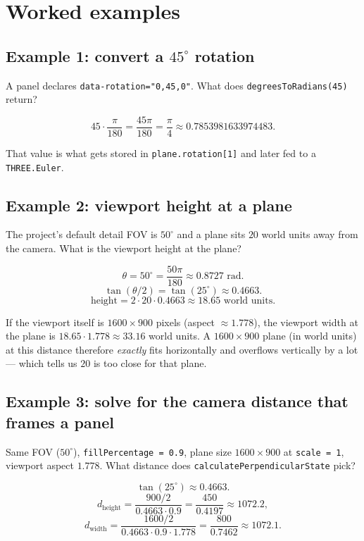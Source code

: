\documentclass{article}
\begin{document}
\section{Worked examples}

\subsection*{Example 1: convert a $45^\circ$ rotation}

A panel declares \lstinline{data-rotation="0,45,0"}. What does
\lstinline{degreesToRadians(45)} return?

\[
  45 \cdot \frac{\pi}{180} = \frac{45\pi}{180} = \frac{\pi}{4} \approx 0.7853981633974483.
\]

That value is what gets stored in \lstinline{plane.rotation[1]} and later
fed to a \lstinline{THREE.Euler}.

\subsection*{Example 2: viewport height at a plane}

The project's default detail FOV is $50^\circ$ and a plane sits $20$ world
units away from the camera. What is the viewport height at the plane?

\[
  \theta = 50^\circ = \frac{50\pi}{180} \approx 0.8727 \text{ rad}.
\]
\[
  \tan(\theta/2) = \tan(25^\circ) \approx 0.4663.
\]
\[
  \text{height} = 2 \cdot 20 \cdot 0.4663 \approx 18.65 \text{ world units}.
\]

If the viewport itself is $1600 \times 900$ pixels (aspect $\approx 1.778$),
the viewport width at the plane is $18.65 \cdot 1.778 \approx 33.16$ world
units. A $1600 \times 900$ plane (in world units) at this distance therefore
\emph{exactly} fits horizontally and overflows vertically by a lot --- which
tells us $20$ is too close for that plane.

\subsection*{Example 3: solve for the camera distance that frames a panel}

Same FOV ($50^\circ$), \lstinline{fillPercentage = 0.9}, plane size
$1600 \times 900$ at \lstinline{scale = 1}, viewport aspect $1.778$. What
distance does \lstinline{calculatePerpendicularState} pick?

\[
  \tan(25^\circ) \approx 0.4663.
\]
\[
  d_{\text{height}} = \frac{900/2}{0.4663 \cdot 0.9}
    = \frac{450}{0.4197} \approx 1072.2,
\]
\[
  d_{\text{width}}  = \frac{1600/2}{0.4663 \cdot 0.9 \cdot 1.778}
    = \frac{800}{0.7462} \approx 1072.1.
\]
\end{document}

